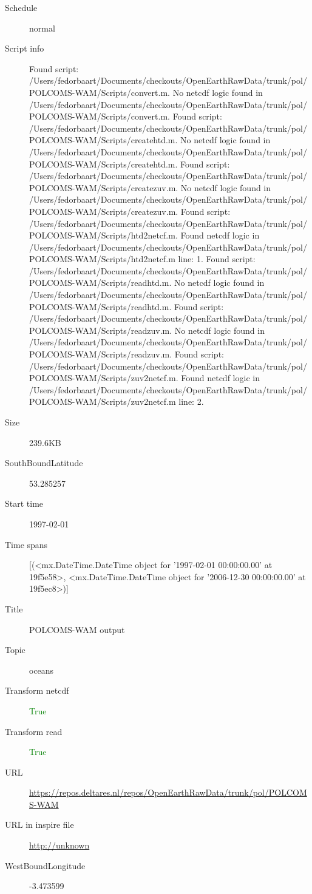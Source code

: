 \documentclass[9]{report}
\begin{document}
\begin{description}
\begin{verbatim}
\end{verbatim}
  \item[Schedule] normal
  \item[Script info] Found script: /Users/fedorbaart/Documents/checkouts/OpenEarthRawData/trunk/pol/POLCOMS-WAM/Scripts/convert.m.
No netcdf logic found in /Users/fedorbaart/Documents/checkouts/OpenEarthRawData/trunk/pol/POLCOMS-WAM/Scripts/convert.m.
Found script: /Users/fedorbaart/Documents/checkouts/OpenEarthRawData/trunk/pol/POLCOMS-WAM/Scripts/createhtd.m.
No netcdf logic found in /Users/fedorbaart/Documents/checkouts/OpenEarthRawData/trunk/pol/POLCOMS-WAM/Scripts/createhtd.m.
Found script: /Users/fedorbaart/Documents/checkouts/OpenEarthRawData/trunk/pol/POLCOMS-WAM/Scripts/createzuv.m.
No netcdf logic found in /Users/fedorbaart/Documents/checkouts/OpenEarthRawData/trunk/pol/POLCOMS-WAM/Scripts/createzuv.m.
Found script: /Users/fedorbaart/Documents/checkouts/OpenEarthRawData/trunk/pol/POLCOMS-WAM/Scripts/htd2netcf.m.
Found netcdf logic in /Users/fedorbaart/Documents/checkouts/OpenEarthRawData/trunk/pol/POLCOMS-WAM/Scripts/htd2netcf.m line: 1.
Found script: /Users/fedorbaart/Documents/checkouts/OpenEarthRawData/trunk/pol/POLCOMS-WAM/Scripts/readhtd.m.
No netcdf logic found in /Users/fedorbaart/Documents/checkouts/OpenEarthRawData/trunk/pol/POLCOMS-WAM/Scripts/readhtd.m.
Found script: /Users/fedorbaart/Documents/checkouts/OpenEarthRawData/trunk/pol/POLCOMS-WAM/Scripts/readzuv.m.
No netcdf logic found in /Users/fedorbaart/Documents/checkouts/OpenEarthRawData/trunk/pol/POLCOMS-WAM/Scripts/readzuv.m.
Found script: /Users/fedorbaart/Documents/checkouts/OpenEarthRawData/trunk/pol/POLCOMS-WAM/Scripts/zuv2netcf.m.
Found netcdf logic in /Users/fedorbaart/Documents/checkouts/OpenEarthRawData/trunk/pol/POLCOMS-WAM/Scripts/zuv2netcf.m line: 2.
  \item[Size] 239.6KB
  \item[SouthBoundLatitude] 53.285257
  \item[Start time] 1997-02-01
  \item[Time spans] [(<mx.DateTime.DateTime object for '1997-02-01 00:00:00.00' at 19f5e58>, <mx.DateTime.DateTime object for '2006-12-30 00:00:00.00' at 19f5ec8>)]
  \item[Title]  POLCOMS-WAM output 
  \item[Topic] oceans
  \item[Transform netcdf] \textcolor{green}{True}
  \item[Transform read] \textcolor{green}{True}
  \item[URL] \href{https://repos.deltares.nl/repos/OpenEarthRawData/trunk/pol/POLCOMS-WAM}{https://repos.deltares.nl/repos/OpenEarthRawData/trunk/pol/POLCOMS-WAM}
  \item[URL in inspire file] \href{http://unknown}{http://unknown}
  \item[WestBoundLongitude] -3.473599
\end{description}
\end{document}
